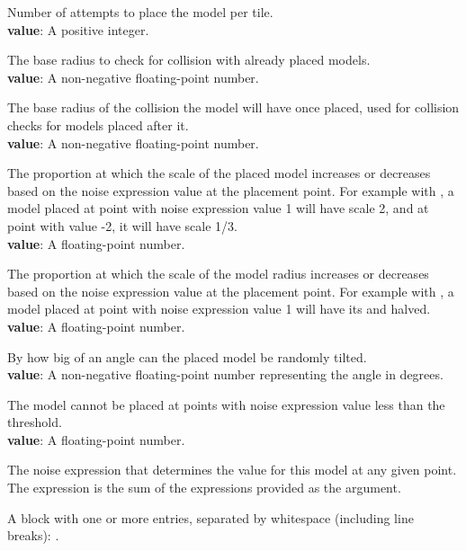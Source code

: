 Number of attempts to place the model per tile.\\
\textbf{value}: A positive integer.

The base radius to check for collision with already placed models.\\
\textbf{value}: A non-negative floating-point number.

The base radius of the collision the model will have once placed, used for collision checks for models placed after it.\\
\textbf{value}: A non-negative floating-point number.

The proportion at which the scale of the placed model increases or decreases based on the noise expression value at the placement point.
For example with , a model placed at point with noise expression value 1 will have scale 2, and at point with value -2, it will have scale 1/3.\\
\textbf{value}: A floating-point number.

The proportion at which the scale of the model radius increases or decreases based on the noise expression value at the placement point.
For example with , a model placed at point with noise expression value 1 will have its  and  halved.\\
\textbf{value}: A floating-point number.

By how big of an angle can the placed model be randomly tilted.\\
\textbf{value}: A non-negative floating-point number representing the angle in degrees.

The model cannot be placed at points with noise expression value less than the threshold.\\
\textbf{value}: A floating-point number.

The noise expression that determines the value for this model at any given point.
The expression is the sum of the expressions provided as the argument.

A block with one or more  entries, separated by whitespace (including line breaks): .

